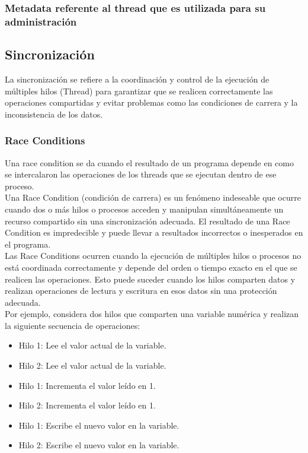 \documentclass[../main.tex]{subfiles}
\begin{document}
        \subsubsection{Metadata referente al thread que es utilizada para su administración}

    \subsection{Sincronización}
        La sincronización se refiere a la coordinación y control de la ejecución de múltiples hilos (Thread) para garantizar que se realicen correctamente las operaciones compartidas y evitar problemas como las condiciones de carrera y la inconsistencia de los datos.

        \subsubsection{Race Conditions}
            Una race condition se da cuando el resultado de un programa depende en como se intercalaron las operaciones de los threads que se ejecutan dentro de ese proceso.\\

            Una Race Condition (condición de carrera) es un fenómeno indeseable que ocurre cuando dos o más hilos o procesos acceden y manipulan simultáneamente un recurso compartido sin una sincronización adecuada. El resultado de una Race Condition es impredecible y puede llevar a resultados incorrectos o inesperados en el programa.\\

            Las Race Conditions ocurren cuando la ejecución de múltiples hilos o procesos no está coordinada correctamente y depende del orden o tiempo exacto en el que se realicen las operaciones. Esto puede suceder cuando los hilos comparten datos y realizan operaciones de lectura y escritura en esos datos sin una protección adecuada.\\

            Por ejemplo, considera dos hilos que comparten una variable numérica y realizan la siguiente secuencia de operaciones:
            \begin{itemize}
                \item Hilo 1: Lee el valor actual de la variable.
                \item Hilo 2: Lee el valor actual de la variable.
                \item Hilo 1: Incrementa el valor leído en 1.
                \item Hilo 2: Incrementa el valor leído en 1.
                \item Hilo 1: Escribe el nuevo valor en la variable.
                \item Hilo 2: Escribe el nuevo valor en la variable.
            \end{itemize}
\end{document}
